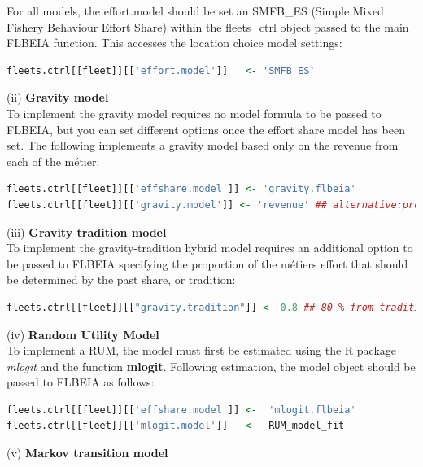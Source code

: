 \documentclass[12pt, halfline, a4paper]{ouparticle}
\begin{document}
For all models, the effort.model should be set an SMFB\_ES (Simple Mixed
Fishery Behaviour Effort Share) within the fleets\_ctrl object passed to the
main FLBEIA function. This accesses the location choice model settings:

\begin{lstlisting}[language=R]
fleets.ctrl[[fleet]][['effort.model']]   <- 'SMFB_ES'
\end{lstlisting}

(ii) \textbf{Gravity model} \\

To implement the gravity model requires no model formula to be passed to
FLBEIA, but you can set different options once the effort share model has been
set. The following implements a gravity model based only on the revenue from
each of the métier:

\begin{lstlisting}[language=R]
fleets.ctrl[[fleet]][['effshare.model']] <- 'gravity.flbeia'
fleets.ctrl[[fleet]][['gravity.model']] <- 'revenue' ## alternative:profit 
\end{lstlisting}

(iii) \textbf{Gravity tradition model} \\

To implement the gravity-tradition hybrid model requires an additional option
to be passed to FLBEIA specifying the proportion of the métiers effort that
should be determined by the past share, or tradition:

\begin{lstlisting}[language=R]
fleets.ctrl[[fleet]][["gravity.tradition"]] <- 0.8 ## 80 % from tradition
\end{lstlisting}

(iv) \textbf{Random Utility Model} \\

To implement a RUM, the model must first be estimated using the R package
\textit{mlogit} \citep{Croissant2019} and the function \textbf{mlogit}.
Following estimation, the model object should be passed to FLBEIA as follows:

\begin{lstlisting}[language=R]
fleets.ctrl[[fleet]][['effshare.model']] <-  'mlogit.flbeia'
fleets.ctrl[[fleet]][['mlogit.model']]   <-  RUM_model_fit
\end{lstlisting}

(v) \textbf{Markov transition model} \\
\end{document}

